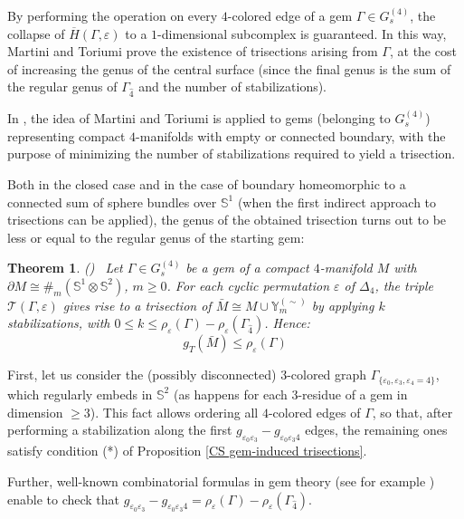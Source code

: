 \documentclass[12pt,a4paper]{article}
\newtheorem{theorem}[lemma]{Theorem}
\newcommand{\e}{\varepsilon}
\newcommand{\G}{\Gamma}
\begin{document}
By performing the operation on every $4$-colored edge of a gem $\Gamma \in G_s^{(4)}$, the collapse of $\overline H(\G,\varepsilon)$ to a $1$-dimensional subcomplex is guaranteed. In this way, Martini and Toriumi prove the existence of trisections arising from $\Gamma$, at the cost of increasing the genus of the central surface (since the final genus is the sum of the regular genus of $\Gamma_{\hat 4}$ and the number of stabilizations). 


\bigskip

In \cite{Casali-Cristofori trisection ter}, the idea of Martini and Toriumi is applied to gems (belonging to  $G_s^{(4)}$) representing compact $4$-manifolds with empty or connected boundary, with the purpose of minimizing the number of stabilizations required to yield a trisection. 
 

Both in the closed case and in the case of boundary homeomorphic to a connected sum of sphere bundles over $\mathbb S^1$ (when the first indirect approach to trisections can  be applied), the  genus of the obtained trisection turns out to be less or equal to the regular genus of the starting gem: 

\begin{theorem} {\rm (\cite{Casali-Cristofori trisection ter})} \ 
Let $\G\in G_s^{(4)}$ be a gem of a compact $4$-manifold $M$ with $\partial M \cong \#_m(\mathbb S^1 \otimes \mathbb S^2)$,  $m \ge 0$.   
For each cyclic permutation $\varepsilon$ of $\Delta_4$, the  triple $\mathcal  T(\Gamma, \varepsilon)$ gives rise to a trisection of $\bar M \cong M \cup{\mathbb Y}_m^{(\sim)}$  by applying $k$  stabilizations, with $0 \le k \le \rho_\e(\Gamma) - \rho_{\e}(\Gamma_{\hat 4})$.
Hence: 
$$g_T(\bar M) \le \rho_\e(\Gamma)$$
\end{theorem}

\par \noindent 
First, let us consider the (possibly disconnected) $3$-colored graph $\G_{\{\e_0,\e_{3},\e_4=4\}}$, which regularly embeds in $\mathbb S^2$ (as happens for each 3-residue of a gem in dimension $ \ge 3$).  
This fact allows ordering all $4$-colored edges of $\Gamma$, so that, after performing a stabilization along the first $g_{\e_0 \e_3}-g_{\e_0 \e_3 4}$ edges, the remaining ones satisfy condition (*) of Proposition \ref{CS gem-induced trisections}. 

\par Further, well-known combinatorial formulas in gem theory (see for example \cite[Proposition 3.1]{generalized-genus}) enable to check that $g_{\e_0 \e_3}-g_{\e_0 \e_3 4} = \rho_\varepsilon(\Gamma) - \rho_\varepsilon(\Gamma_{\hat 4})$.
\end{document}
